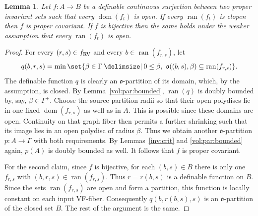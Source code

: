 \documentclass[12pt]{amsart}
\theoremstyle{plain}
\newtheorem{lem}[thm]{Lemma}
\theoremstyle{definition}
\theoremstyle{remark}
\numberwithin{equation}{section}
\theoremstyle{plain}
\newcommand{\RV}{\textup{RV}}
\DeclareMathOperator{\ran}{ran}
\DeclareMathOperator{\dom}{dom}
\newcommand{\go}{\mathfrak{o}}
\newcommand{\0}{\emptyset}
\newcommand{\fun}{\longrightarrow}
\newcommand{\sub}{\subseteq}
\providecommand\given{}
\newcommand\SetSymbol[1][]{%
\nonscript \: #1 \vert
\allowbreak
\nonscript\:
\mathopen{}}
\renewcommand\given{\SetSymbol[\delimsize]}
\begin{document}
\begin{lem}\label{conti:covar}
Let $f : A \fun B$ be a definable continuous surjection between two proper invariant sets such that  every $\dom(f_t)$ is open. If every $\ran(f_t)$ is clopen then $f$ is proper covariant. If $f$ is bijective then the same holds under the weaker assumption that   every $\ran(f_t)$ is open.
\end{lem}
\begin{proof}
For every $(r, s) \in f_{\RV}$ and every $b \in \ran(f_{r,s})$, let
\[
q(b,r,s) = \min\set{\beta \in \Gamma \given 0\leq\beta,\ \go((b,s), \beta) \sub \ran(f_{r,s})}.
\]
The definable function $q$ is clearly an $\go$-partition of its domain, which, by the assumption, is closed. By Lemma~\ref{vol:par:bounded}, $\ran(q)$ is doubly bounded by, say, $\beta \in \Gamma^+$. Choose the source partition radii so that their open polydiscs lie in one fixed $\dom(f_{r,s})$ as well as in $A$. This is possible since these domains are open. Continuity on that graph fiber then permits a further shrinking such that its image lies in an open polydisc of radius $\beta$. Thus we obtain another $\go$-partition $p:A\fun\Gamma$ with both requirements. By Lemmas~\ref{inv:crit} and \ref{vol:par:bounded} again,  $p(A)$ is doubly bounded as well. It follows that $f$ is  proper covariant.

For the second claim, since $f$ is bijective, for each $(b, s) \in B$ there is only one  $f_{r,s}$ with $(b,r, s) \in \ran(f_{r,s})$. Thus $r=r(b,s)$ is a definable function on $B$. Since the sets $\ran(f_{r,s})$ are open and form a partition, this function is locally constant on each input VF-fiber. Consequently $q(b,r(b,s),s)$ is an $\go$-partition of the closed set $B$. The rest of the argument is the same.
\end{proof}
\end{document}

